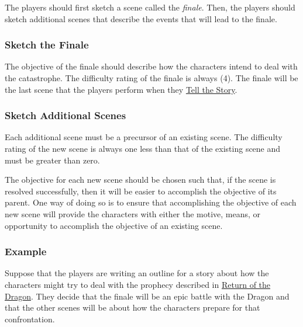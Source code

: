\documentclass[12pt, a5paper, parskip=half-]{scrartcl}
\begin{document}
The players should first sketch a scene called the \emph{finale}.
Then, the players should sketch additional scenes that describe the events that will lead to the finale.

\subsubsection*{Sketch the Finale} \label{subsubsection:sketch-the-finale}
The objective of the finale should describe how the characters intend to deal with the catastrophe.
The difficulty rating of the finale is always (4).
The finale will be the last scene that the players perform when they \hyperref[subsection:tell-the-story]{\cinzel \small Tell the Story}.

\subsubsection*{Sketch Additional Scenes} \label{subsubsection:sketch-additional-scenes}
Each additional scene must be a precursor of an existing scene.
The difficulty rating of the new scene is always one less than that of the existing scene and must be greater than zero.

The objective for each new scene should be chosen such that, if the scene is resolved successfully, then it will be easier to accomplish the objective of its parent. One way of doing so is to ensure that accomplishing the objective of each new scene will provide the characters with either the motive, means, or opportunity to accomplish the objective of an existing scene.

\newpage

\subsubsection*{Example} \label{example:write-an-outline}
Suppose that the players are writing an outline for a story about how the characters might try to deal with the prophecy described in \hyperref[subsection:return-of-the-dragon]{\cinzel \small Return of the Dragon}.  They decide that the finale will be an epic battle with the Dragon and that the other scenes will be about how the characters prepare for that confrontation.
\end{document}
